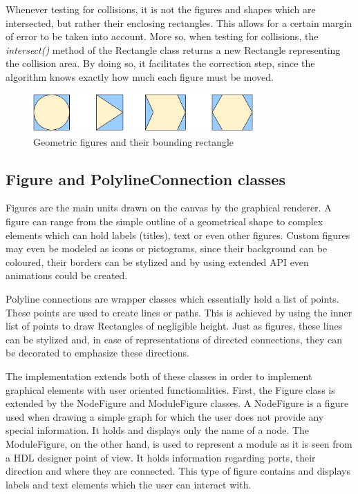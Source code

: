 Whenever testing for collisions, it is not the figures and shapes which are intersected, but rather their 
enclosing rectangles. This allows for a certain margin of error to be taken into account. More so, when 
testing for collisions, the \emph{intersect()} method of the Rectangle class returns a new Rectangle 
representing the collision area. By doing so, it facilitates the correction step, since the algorithm 
knows exactly how much each figure must be moved.

\begin{figure}[ht] \centering
\includegraphics[width=0.75\textwidth]{img/implementation/rectangles.png}
\caption{Geometric figures and their bounding rectangle \label{recs}} \end{figure}

\subsection{Figure and PolylineConnection classes}

Figures are the main units drawn on the canvas by the graphical renderer. A figure can 
range from the simple outline of a geometrical shape to complex elements which can hold labels (titles), text 
or even other figures. Custom figures may even be modeled as icons or pictograms, since their background can be 
coloured, their borders can be stylized and by using extended API even animations could be created.

Polyline connections are wrapper classes which essentially hold a list of points. These points are used to create 
lines or paths. This is achieved by using the inner list of points to draw Rectangles of negligible height. Just 
as figures, these lines can be stylized and, in case of representations of directed connections, they can be 
decorated to emphasize these directions.

The implementation extends both of these classes in order to implement graphical elements with user oriented 
functionalities. First, the Figure class is extended by the NodeFigure and ModuleFigure classes. A NodeFigure 
is a figure used when drawing a simple graph for which the user does not provide any special information.
It holds and displays only the name of a node. The ModuleFigure, on the other hand, is used to represent a 
module as it is seen from a HDL designer point of view. It holds information regarding ports, their direction 
and where they are connected. This type of figure contains and displays labels and text elements which the user 
can interact with.

